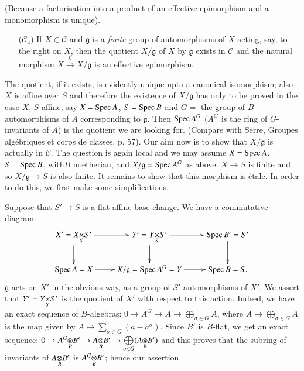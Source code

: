 (Because a factorisation into a product of an effective epimorphism
and a monomorphism is unique).

\begin{itemize}
\item[($\mathscr{C}_{4}$)] If $X\in \mathscr{C}$ and $\mathfrak{g}$ is
  a {\em finite} group of automorphisms of $X$ acting, say, to the
  right on $X$, then the quotient $X/\mathfrak{g}$ of $X$ by
  $\mathfrak{g}$ exists in $\mathscr{C}$ and the natural morphism
  $X\xrightarrow{\eta}X/\mathfrak{g}$ is an effective epimorphism.
\end{itemize}

The quotient, if it exists, is evidently unique upto a canonical
isomorphism; also $X$ is affine over $S$ and therefore the existence
of $X/\mathfrak{g}$ has only to be proved in the case $X$, $S$ affine,
say $X=\operatorname{Spec} A$, $S=\operatorname{Spec} B$ and $G=$ the group of $B$-automorphisms
of $A$ corresponding to $\mathfrak{g}$. Then $\operatorname{Spec} A^{G}$ ($A^{G}$ is
the ring of $G$-invariants of $A$) is the quotient we are looking
for. (Compare with Serre, Groupes alg\'ebriques et corps de classes,
p. 57). Our aim now is to show that $X/\mathfrak{g}$ is actually in
$\mathscr{C}$. The question is again local and we may assume $X=\operatorname{Spec}
A$, $S=\operatorname{Spec} B$, with\pageoriginale $B$ noetherian, and
$X/\mathfrak{g}=\operatorname{Spec} A^{G}$ as above. $X\to S$ is finite and so
$X/\mathfrak{g}\to S$ is also finite. It remains to show that this
morphism is \'etale. In order to do this, we first make some
simplifications. 

Suppose that $S'\to S$ is a flat affine base-change. We have a
commutative diagram:
\[
\xymatrix{
X'=\fprod{X}{S'}{S}\ar[d]\ar[r] & Y'=\fprod{Y}{S'}{S}\ar[d]\ar[r] &
\Spec B'=S'\ar[d]\\
\Spec A=X \ar[r] & X/\mathfrak{g}=\Spec A^{G}=Y\ar[r] & \Spec B=S.
}
\]
$\mathfrak{g}$ acts on $X'$ in the obvious way, as a group of
$S'$-automorphisms of $X'$. We assert that $Y'=\fprod{Y}{S'}{S}$ is
the quotient of $X'$ with respect to this action. Indeed, we have an
exact sequence of $B$-algebras: $0\to A^{G}\to A\to
\bigoplus\limits_{\sigma\in G}A$, where $A\to
\bigoplus\limits_{\sigma\in G}A$ is the map given by $A\mapsto
\sum\limits_{\sigma\in G}(a-a^{\sigma})$. Since $B'$ is $B$-flat, we
get an exact sequence: $0\to \foprod{A^{G}}{B'}{B}\to
\foprod{A}{B'}{B}\to \bigoplus\limits_{\sigma \in
  G}(\foprod{A}{B'}{B})$ and this proves that the subring of
invariants of $\foprod{A}{B'}{B}$ is $\foprod{A^{G}}{B'}{B}$; hence
our assertion.

